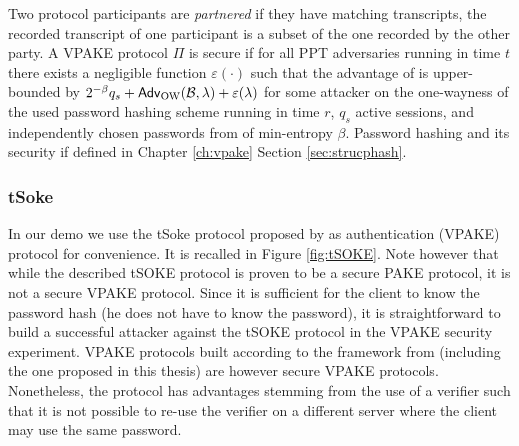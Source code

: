 \noindent
Two protocol participants are \emph{partnered} if they have matching transcripts, \ie the recorded transcript of one participant is a subset of the one recorded by the other party.
A \ac{VPAKE} protocol $\Pi$ is secure if for all \ac{PPT} adversaries \cA running in time $t$ there exists a negligible function $\varepsilon(\cdot)$ such that the advantage of \cA is upper-bounded by
$2^{-\beta}q_s + \mathsf{Adv}_{\text{OW}}(\mathcal{B}, \lambda) + \varepsilon(\lambda)$
for some attacker \cB on the one-wayness of the used password hashing scheme running in time $r$, $q_s$ active sessions, and independently chosen passwords from \cD of min-entropy $\beta$.
Password hashing and its security if defined in Chapter \ref{ch:vpake} Section \ref{sec:strucphash}.


\subsubsection{tSoke} \label{sec:tsoke}
In our demo we use the tSoke protocol proposed by \citet{Manulis2014} as authentication (\ac{VPAKE}) protocol for convenience.
It is recalled in Figure \ref{fig:tSOKE}.
Note however that while the described tSOKE protocol is proven to be a secure \ac{PAKE} protocol, it is not a secure \ac{VPAKE} protocol.
Since it is sufficient for the client to know the password hash (he does not have to know the password), it is straightforward to build a successful attacker against the tSOKE protocol in the \ac{VPAKE} security experiment.
\ac{VPAKE} protocols built according to the framework from \citet{BenhamoudaP13} (including the one proposed in this thesis) are however secure \ac{VPAKE} protocols.
Nonetheless, the protocol has advantages stemming from the use of a verifier such that it is not possible to re-use the verifier on a different server where the client may use the same password.

